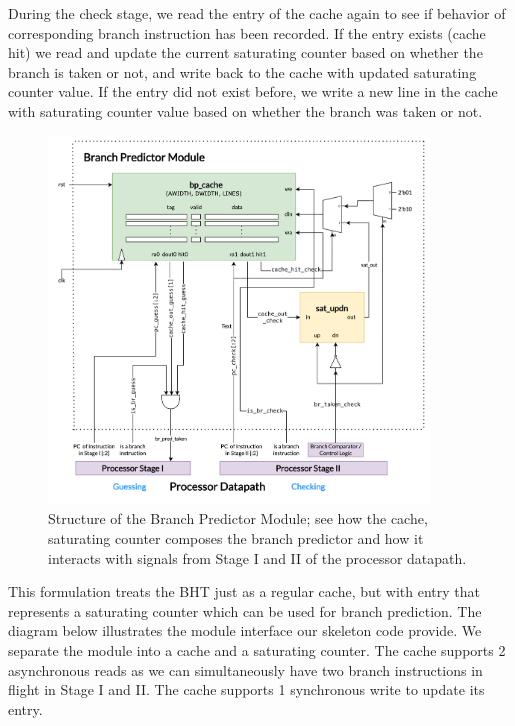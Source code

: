 \documentclass[11pt]{article}
\begin{document}
During the check stage, we read the entry of the cache again to see if behavior of corresponding branch instruction has been recorded. If the entry exists (cache hit) we read and update the current saturating counter based on whether the branch is taken or not, and write back to the cache with updated saturating counter value. If the entry did not exist before, we write a new line in the cache with saturating counter value based on whether the branch was taken or not.


\begin{figure}[hbt]
  \begin{center}
    \includegraphics[width=0.9\textwidth]{images/branch_predictor.png}
    \caption{Structure of the Branch Predictor Module; see how the cache, saturating counter composes the branch predictor and how it interacts with signals from Stage I and II of the processor datapath.}
    \label{fig:mem_arch}
  \end{center}
\end{figure}


This formulation treats the BHT just as a regular cache, but with entry that represents a saturating counter which can be used for branch prediction. The diagram below illustrates the module interface our skeleton code provide. We separate the module into a cache and a saturating counter. The cache supports 2 asynchronous reads as we can simultaneously have two branch instructions in flight in Stage I and II. The cache supports 1 synchronous write to update its entry. 
\end{document}
